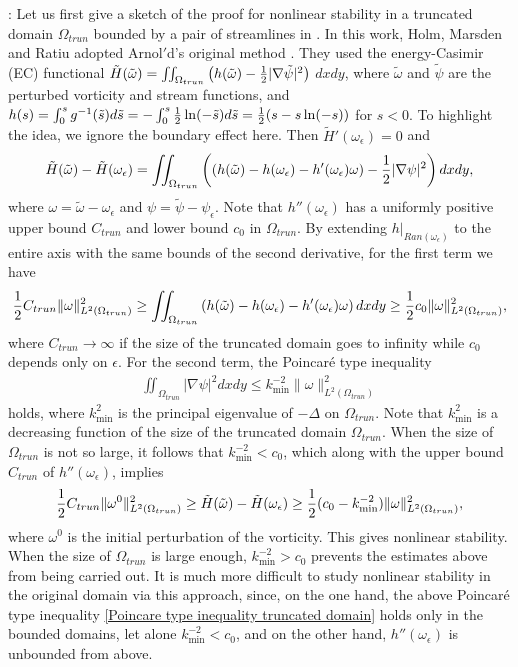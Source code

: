 \documentclass[1 [leqno, 11pt]{amsart}
\numberwithin{equation}{section}
\let\ep=\epsilon
\begin{document}
\begin{CJK*}{GBK}{song}
:
Let us first give a  sketch of the proof for nonlinear  stability in a truncated   domain $\Omega_{trun}$ bounded  by a pair of streamlines in \cite{holm1986nonlinear}. In this work,
Holm, Marsden and Ratiu adopted Arnol$'$d's original  method \cite{Arnold65,Arnold69}. They used the energy-Casimir (EC) functional $\tilde H(\tilde\omega)= \iint_{\Omega_{trun}}\left(h(\tilde\omega)-{1\over2}|\nabla\tilde\psi|^2\right)$ $dxdy$, where $\tilde \omega$ and $\tilde \psi$ are the perturbed vorticity and stream functions, and  $h(s)=\int_0^sg^{-1}(\tilde s)d\tilde s=-\int_0^s{1\over 2}\ln(-\tilde s)d\tilde s={1\over2}(s-s\ln(-s))$ for $s<0$. To highlight the idea, we ignore the boundary effect here. Then $\tilde H'(\omega_\ep)=0$ and
\begin{align*}
\tilde H(\tilde\omega)-\tilde H(\omega_\ep)=\iint_{\Omega_{trun}}\left((h(\tilde\omega)-h(\omega_\ep)-h'(\omega_\ep)\omega)-{1\over2}|\nabla\psi|^2\right)dxdy,
\end{align*}
where $\omega=\tilde \omega-\omega_\ep$ and $\psi=\tilde \psi-\psi_\ep$. Note that  $h''(\omega_\ep)$ has a uniformly positive upper bound $C_{trun}$ and lower bound $c_0$ in $\Omega_{trun}$. By extending $h|_{Ran(\omega_\ep)}$ to the entire axis with the same bounds of the second derivative, for the first term we have
$${1\over2} C_{trun}\|\omega\|_{L^2(\Omega_{trun})}^2\geq\iint_{\Omega_{trun}}\left(h(\tilde\omega)-h(\omega_\ep)-h'(\omega_\ep)\omega\right)dxdy\geq {1\over2} c_0\|\omega\|_{L^2(\Omega_{trun})}^2,$$
where $C_{trun}\to\infty$ if the size of  the truncated domain goes to infinity while $c_0$  depends only on $\ep$.
For the second term, the Poincar\'e type inequality
\begin{align}\label{Poincare type inequality truncated domain}
\iint_{\Omega_{trun}}|\nabla\psi|^2dxdy\leq k_{\min}^{-2}\|\omega\|_{L^2(\Omega_{trun})}^2
\end{align}
 holds,
where $k_{\min}^2$ is the principal eigenvalue of $-\Delta$ on  $\Omega_{trun}$.
Note that $k_{\min}^2$ is a decreasing function of the size of the truncated domain $\Omega_{trun}$. When the  size of $\Omega_{trun}$ is not so large, it follows that $ k_{\min}^{-2}<c_0$, which along with  the upper bound $C_{trun}$ of  $h''(\omega_\ep)$, implies
\begin{align*}
{1\over2}C_{trun}\|\omega^0\|_{L^2(\Omega_{trun})}^2\geq\tilde H(\tilde\omega)-\tilde H(\omega_\ep)\geq {1\over2} (c_0-k_{\min}^{-2})\|\omega\|_{L^2(\Omega_{trun})}^2,
\end{align*}
where $\omega^0$ is the initial perturbation of the vorticity.
This gives nonlinear stability.
When the  size of $\Omega_{trun}$ is  large enough,  $ k_{\min}^{-2}>c_0$ prevents the estimates above from being carried out.
It is much more difficult to study nonlinear stability in the original domain  via this approach, since, on the one hand,
 the above  Poincar\'e type inequality \eqref{Poincare type inequality truncated domain} holds only in the bounded domains, let alone $k_{\min}^{-2}<c_0$,
and on the other hand,
 $h''(\omega_\ep)$ is unbounded from above.


\end{CJK*}
\end{document}
